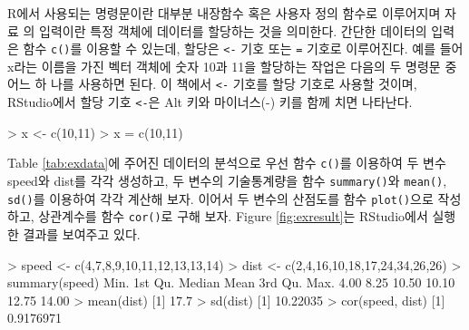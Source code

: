 \documentclass[
]{book}
\newenvironment{Shaded}{\begin{snugshade}}{\end{snugshade}}
\newcommand{\DecValTok}[1]{\textcolor[rgb]{0.00,0.00,0.81}{#1}}
\newcommand{\FloatTok}[1]{\textcolor[rgb]{0.00,0.00,0.81}{#1}}
\newcommand{\FunctionTok}[1]{\textcolor[rgb]{0.00,0.00,0.00}{#1}}
\newcommand{\NormalTok}[1]{#1}
\newcommand{\OtherTok}[1]{\textcolor[rgb]{0.56,0.35,0.01}{#1}}
\newcommand{\SpecialCharTok}[1]{\textcolor[rgb]{0.00,0.00,0.00}{#1}}
\begin{document}
R에서 사용되는 명령문이란 대부분 내장함수 혹은 사용자 정의 함수로
이루어지며 자료 의 입력이란 특정 객체에 데이터를 할당하는 것을 의미한다.
간단한 데이터의 입력은 함수 \texttt{c()}를 이용할 수 있는데, 할당은 \texttt{\textless{}-} 기호
또는 \texttt{=} 기호로 이루어진다. 예를 들어 x라는 이름을 가진 벡터 객체에 숫자
10과 11을 할당하는 작업은 다음의 두 명령문 중 어느 하 나를 사용하면
된다. 이 책에서 \texttt{\textless{}-} 기호를 할당 기호로 사용할 것이며, RStudio에서 할당
기호 \texttt{\textless{}-}은 Alt 키와 마이너스(-) 키를 함께 치면 나타난다.

\begin{Shaded}
\begin{Highlighting}[]
\SpecialCharTok{\textgreater{}}\NormalTok{ x }\OtherTok{\textless{}{-}} \FunctionTok{c}\NormalTok{(}\DecValTok{10}\NormalTok{,}\DecValTok{11}\NormalTok{)}
\SpecialCharTok{\textgreater{}}\NormalTok{ x }\OtherTok{=} \FunctionTok{c}\NormalTok{(}\DecValTok{10}\NormalTok{,}\DecValTok{11}\NormalTok{)}
\end{Highlighting}
\end{Shaded}

Table \ref{tab:exdata}에 주어진 데이터의 분석으로 우선 함수 \texttt{c()}를
이용하여 두 변수 speed와 dist를 각각 생성하고, 두 변수의 기술통계량을
함수 \texttt{summary()}와 \texttt{mean()}, \texttt{sd()}를 이용하여 각각 계산해 보자. 이어서
두 변수의 산점도를 함수 \texttt{plot()}으로 작성하고, 상관계수를 함수 \texttt{cor()}로
구해 보자. Figure \ref{fig:exresult}는 RStudio에서 실행한 결과를
보여주고 있다.

\begin{Shaded}
\begin{Highlighting}[]
\SpecialCharTok{\textgreater{}}\NormalTok{ speed }\OtherTok{\textless{}{-}} \FunctionTok{c}\NormalTok{(}\DecValTok{4}\NormalTok{,}\DecValTok{7}\NormalTok{,}\DecValTok{8}\NormalTok{,}\DecValTok{9}\NormalTok{,}\DecValTok{10}\NormalTok{,}\DecValTok{11}\NormalTok{,}\DecValTok{12}\NormalTok{,}\DecValTok{13}\NormalTok{,}\DecValTok{13}\NormalTok{,}\DecValTok{14}\NormalTok{)}
\SpecialCharTok{\textgreater{}}\NormalTok{ dist }\OtherTok{\textless{}{-}} \FunctionTok{c}\NormalTok{(}\DecValTok{2}\NormalTok{,}\DecValTok{4}\NormalTok{,}\DecValTok{16}\NormalTok{,}\DecValTok{10}\NormalTok{,}\DecValTok{18}\NormalTok{,}\DecValTok{17}\NormalTok{,}\DecValTok{24}\NormalTok{,}\DecValTok{34}\NormalTok{,}\DecValTok{26}\NormalTok{,}\DecValTok{26}\NormalTok{)}
\SpecialCharTok{\textgreater{}} \FunctionTok{summary}\NormalTok{(speed)}
\NormalTok{   Min. 1st Qu.  Median    Mean 3rd Qu.    Max. }
   \FloatTok{4.00}    \FloatTok{8.25}   \FloatTok{10.50}   \FloatTok{10.10}   \FloatTok{12.75}   \FloatTok{14.00} 
\SpecialCharTok{\textgreater{}} \FunctionTok{mean}\NormalTok{(dist)}
\NormalTok{[}\DecValTok{1}\NormalTok{] }\FloatTok{17.7}
\SpecialCharTok{\textgreater{}} \FunctionTok{sd}\NormalTok{(dist)}
\NormalTok{[}\DecValTok{1}\NormalTok{] }\FloatTok{10.22035}
\SpecialCharTok{\textgreater{}} \FunctionTok{cor}\NormalTok{(speed, dist)}
\NormalTok{[}\DecValTok{1}\NormalTok{] }\FloatTok{0.9176971}
\end{Highlighting}
\end{Shaded}
\end{document}
